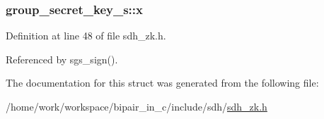 \hypertarget{structgroup__secret__key__s_a1c239f9d6501e2f14a42f7ecc56cbc1b}{
\subsubsection[{x}]{ group\-\_\-secret\-\_\-key\-\_\-s\-::x}}\label{structgroup__secret__key__s_a1c239f9d6501e2f14a42f7ecc56cbc1b}


Definition at line 48 of file sdh\-\_\-zk.\-h.



Referenced by sgs\-\_\-sign().



The documentation for this struct was generated from the following file\-:\begin{DoxyCompactItemize}
\item 
/home/work/workspace/bipair\-\_\-in\-\_\-c/include/sdh/\hyperlink{sdh__zk_8h}{sdh\-\_\-zk.\-h}\end{DoxyCompactItemize}
